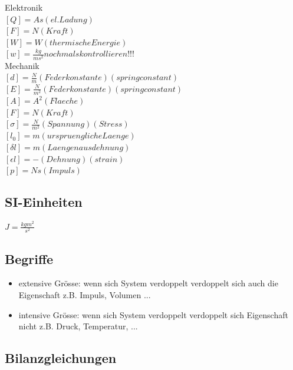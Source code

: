 \documentclass[a4paper]{scrartcl}
\begin{document}
Elektronik\\
$ [Q]=As (el. Ladung)$\\
$ [F]=N (Kraft)$\\
$ [W]=W (thermische Energie)$\\
$ [w]=\frac{kg}{ms^2} nochmals kontrollieren!!! $\\


Mechanik\\
$ [d]=\frac{N}{m} (Federkonstante)(spring constant)$\\
$ [E]=\frac{N}{m^2} (Federkonstante)(spring constant)$\\
$ [A]=A^2 (Flaeche)$\\
$ [F]=N (Kraft)$\\
$ [\sigma]=\frac{N}{m^2} (Spannung)(Stress)$\\
$ [l_0]=m (urspruengliche Laenge)$\\
$ [\delta l]=m (Laengenausdehnung)$\\
$ [\epsilon l]=- (Dehnung)(strain)$\\
$ [p]=Ns (Impuls)$\\



\subsection{SI-Einheiten}
$ J = \frac{kg m^2}{s^2} $\\

\subsection{Begriffe}
\begin{itemize}
\item extensive Grösse: wenn sich System verdoppelt verdoppelt sich auch die Eigenschaft z.B. Impuls, Volumen ...
\item intensive Grösse: wenn sich System verdoppelt verdoppelt sich Eigenschaft nicht z.B. Druck, Temperatur, ...
\end{itemize}


\subsection{Bilanzgleichungen}
\end{document}
